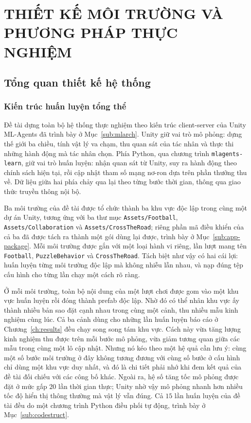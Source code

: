 \fontsize{13pt}{22.5pt}\selectfont

\clearpage
\section{THIẾT KẾ MÔI TRƯỜNG VÀ PHƯƠNG PHÁP THỰC NGHIỆM}
\label{ch:design}


\subsection{Tổng quan thiết kế hệ thống}

\subsubsection{Kiến trúc huấn luyện tổng thể}
\indent Đề tài dựng toàn bộ hệ thống thực nghiệm theo kiến trúc client-server của Unity
ML-Agents đã trình bày ở Mục~\ref{sub:mlarch}. Unity giữ vai trò mô phỏng: dựng thế giới
ba chiều, tính vật lý va chạm, thu quan sát của tác nhân và thực thi những hành động mà
tác nhân chọn. Phía Python, qua chương trình \texttt{mlagents-learn}, giữ vai trò huấn
luyện: nhận quan sát từ Unity, suy ra hành động theo chính sách hiện tại, rồi cập nhật
tham số mạng nơ-ron dựa trên phần thưởng thu về. Dữ liệu giữa hai phía chảy qua lại theo
từng bước thời gian, thông qua giao thức truyền thông nội bộ.

{\sloppy
\indent Ba môi trường của đề tài được tổ chức thành ba khu vực độc lập trong cùng một
dự án Unity, tương ứng với ba thư mục \texttt{Assets/\allowbreak Football},
\texttt{Assets/\allowbreak Collaboration} và \texttt{Assets/\allowbreak CrossTheRoad};
riêng phần mã điều khiển của cả ba đã được tách ra thành một gói dùng lại được, trình
bày ở Mục~\ref{sub:app-package}. Mỗi môi trường được gắn
với một loại hành vi riêng, lần lượt mang tên \texttt{Football}, \texttt{PuzzleBehavior}
và \texttt{CrossTheRoad}. Tách biệt như vậy có hai cái lợi: huấn luyện từng môi trường
độc lập mà không nhiễu lẫn nhau, và nạp đúng tệp cấu hình cho từng lần chạy một cách rõ
ràng.\par}

\indent Ở mỗi môi trường, toàn bộ nội dung của một lượt chơi được gom vào một khu vực
huấn luyện rồi đóng thành prefab độc lập. Nhờ đó có thể nhân khu vực ấy thành nhiều bản
sao đặt cạnh nhau trong cùng một cảnh, thu nhiều mẫu kinh nghiệm cùng lúc. Cả ba cảnh
dùng cho những lần huấn luyện báo cáo ở Chương~\ref{ch:results} đều chạy song song tám
khu vực. Cách này vừa tăng lượng kinh nghiệm thu được trên mỗi bước mô phỏng, vừa giảm
tương quan giữa các mẫu trong cùng một lô cập nhật. Nhưng nó kéo theo một hệ quả cần lưu
ý: cùng một số bước môi trường ở đây không tương đương với cùng số bước ở cấu hình chỉ
dùng một khu vực duy nhất, và đó là chi tiết phải nhớ khi đem kết quả của đề tài đối
chiếu với các công bố khác. Ngoài ra, hệ số tăng tốc mô phỏng được đặt ở mức gấp $20$ lần thời
gian thực; Unity nhờ vậy mô phỏng nhanh hơn nhiều tốc độ hiển thị thông thường mà
vật lý vẫn đúng. Cả $15$ lần huấn luyện của đề tài đều do một chương trình Python điều
phối tự động, trình bày ở Mục~\ref{sub:codestruct}.

